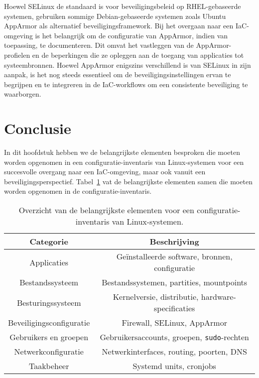 Hoewel SELinux de standaard is voor beveiligingsbeleid op RHEL-gebaseerde systemen, gebruiken sommige Debian-gebaseerde systemen zoals Ubuntu AppArmor als alternatief beveiligingsframework.
Bij het overgaan naar een IaC-omgeving is het belangrijk om de configuratie van AppArmor, indien van toepassing, te documenteren.
Dit omvat het vastleggen van de AppArmor-profielen en de beperkingen die ze opleggen aan de toegang van applicaties tot systeembronnen.
Hoewel AppArmor enigszins verschillend is van SELinux in zijn aanpak, is het nog steeds essentieel om de beveiligingsinstellingen ervan te begrijpen en te integreren in de IaC-workflows om een consistente beveiliging te waarborgen.

\section{Conclusie}
\label{risico_conclusie}

In dit hoofdstuk hebben we de belangrijkste elementen besproken die moeten worden opgenomen in een configuratie-inventaris van Linux-systemen voor een succesvolle overgang naar een IaC-omgeving, maar ook vanuit een beveiligingsperspectief.
Tabel~\ref{table:risico_conclusie} vat de belangrijkste elementen samen die moeten worden opgenomen in de configuratie-inventaris.

\begin{table}[!h]
    \begin{center}
        \begin{tabular}{ c c }
            \hline
                Categorie & Beschrijving \\ [0.5ex] 
            \hline
                Applicaties              & Ge\"installeerde software, bronnen, configuratie \\
                Bestandssysteem          & Bestandssystemen, partities, mountpoints \\
                Besturingssysteem        & Kernelversie, distributie, hardware-specificaties \\
                Beveiligingsconfiguratie & Firewall, SELinux, AppArmor \\
                Gebruikers en groepen    & Gebruikersaccounts, groepen, \texttt{sudo}-rechten \\
                Netwerkconfiguratie      & Netwerkinterfaces, routing, poorten, DNS \\
                Taakbeheer               & Systemd units, cronjobs \\
        \end{tabular}
    \end{center}
    \caption[Belangrijke elementen configuratie-inventaris.]{Overzicht van de belangrijkste elementen voor een configuratie-inventaris van Linux-systemen.}
    \label{table:risico_conclusie}
\end{table}

